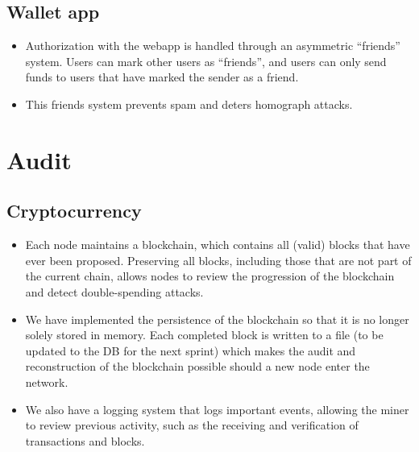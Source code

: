 \documentclass[a4paper,12pt]{article}
\begin{document}
\subsection{Wallet app}

\begin{itemize}
\item Authorization with the webapp is handled through an asymmetric ``friends'' system. Users can mark other users as ``friends'', and users can only send funds to users that have marked the sender as a friend.
\item This friends system prevents spam and deters homograph attacks.
\end{itemize}

\section{Audit}

\subsection{Cryptocurrency}

\begin{itemize}
\item Each node maintains a blockchain, which contains all (valid) blocks that have ever been proposed. Preserving all blocks, including those that are not part of the current chain, allows nodes to review the progression of the blockchain and detect double-spending attacks.
\begin{comment}
\item Miners heavily audit the work of other miners in order to maintain the integrity of the blockchain.
\item For each block a miner receives (or broadcasts), its hash will be checked to see if it satisfies a set difficulty.
\item Every transaction inside of the block is verified by checking that each input has a corresponding unspent output (UTXO), that the signature for each input was signed with the private key corresponding to the public key on the previous UTXO, and that the sum of the input amounts (from the UTXO's) is equal to the sum of the outputs.
\item If either of these checks fail, the potential new block will be rejected.
\item So long as an adversary does not control a majority of nodes in the network, blocks will not be added to the blockchain that are not correct.
\end{comment}
\item We have implemented the persistence of the blockchain so that it is no longer solely stored in memory. Each completed block is written to a file (to be updated to the DB for the next sprint) which makes the audit and reconstruction of the blockchain possible should a new node enter the network.
\item We also have a logging system that logs important events, allowing the miner to review previous activity, such as the receiving and verification of transactions and blocks.
\end{itemize}
\end{document}
